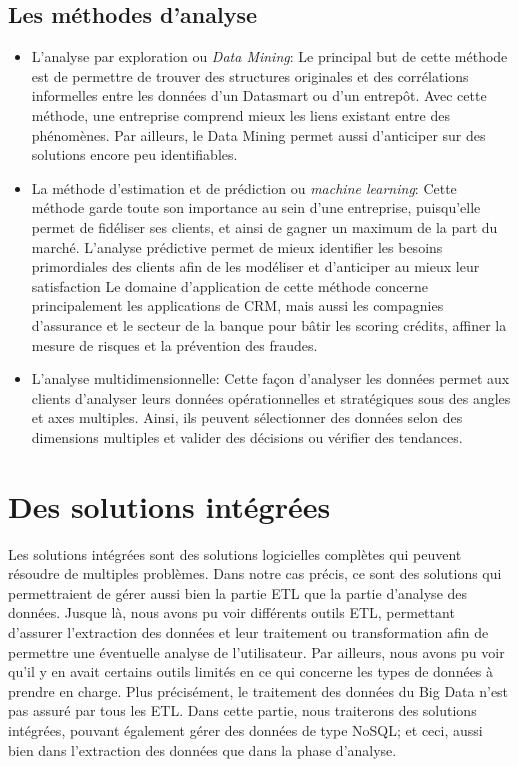 \documentclass[12pt,a4wide,twoside]{report}
\begin{document}
				\subsection{Les méthodes d'analyse}
	\begin{itemize}
		\item L'analyse par exploration ou \emph{Data Mining}: \newline
		Le principal but de cette méthode est de permettre de trouver des structures originales et des corrélations informelles entre les données d'un Datasmart ou d'un entrepôt. Avec cette méthode, une entreprise comprend mieux les liens existant entre des phénomènes. Par ailleurs, le Data Mining permet aussi d'anticiper sur des solutions encore peu identifiables. \newline
		\item La méthode d'estimation et de prédiction ou \emph{machine learning}: \newline
		Cette méthode garde toute son importance au sein d'une entreprise, puisqu'elle permet de fidéliser ses clients, et ainsi de gagner un maximum de la part du marché. L'analyse prédictive permet de mieux identifier les besoins primordiales des clients afin de les modéliser et d'anticiper au mieux leur satisfaction\newline
		Le domaine d'application de cette méthode concerne principalement les applications de CRM, mais aussi les compagnies d'assurance et le secteur de la banque pour bâtir les scoring crédits, affiner la mesure de risques et la prévention des fraudes. \newline
		\item L'analyse multidimensionnelle: \newline
		Cette façon d'analyser les données permet aux clients d'analyser leurs données opérationnelles et stratégiques sous des angles et axes multiples. Ainsi, ils peuvent sélectionner des données selon des dimensions multiples et valider des décisions ou vérifier des tendances.		
	\end{itemize}

	\section{Des solutions intégrées}
	Les solutions intégrées sont des solutions logicielles complètes qui peuvent résoudre de multiples problèmes. Dans notre cas précis, ce sont des solutions qui permettraient de gérer aussi bien la partie ETL que la partie d'analyse des données.\newline
	Jusque là, nous avons pu voir différents outils ETL, permettant d'assurer l'extraction des données et leur traitement ou transformation afin de permettre une éventuelle analyse de l'utilisateur. Par ailleurs, nous avons pu voir qu'il y en avait certains outils limités en ce qui concerne les types de données à prendre en charge. Plus précisément, le traitement des données du Big Data n'est pas assuré par tous les ETL. \newline
	Dans cette partie, nous traiterons des solutions intégrées, pouvant également gérer des données de type NoSQL; et ceci, aussi bien dans l'extraction des données que dans la phase d'analyse.
	
\end{document}
